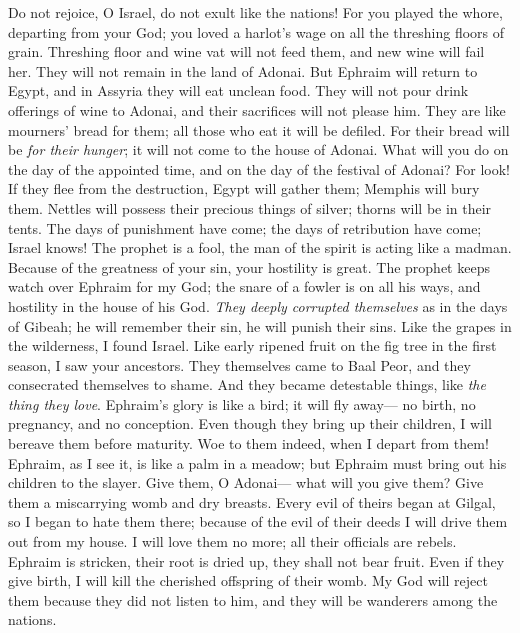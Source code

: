 \begin{biblechapter} %
 Do not rejoice, O Israel, 
do not exult like the nations! 
For you played the whore, departing from your God; 
you loved a harlot’s wage 
on all the threshing floors of grain.
\verse Threshing floor and wine vat will not feed them, 
and new wine will fail her.
\verse They will not remain 
in the land of Adonai. 
But Ephraim will return to Egypt, 
and in Assyria they will eat unclean food.
\verse They will not pour drink offerings of wine to Adonai, 
and their sacrifices will not please him. 
They are like mourners’ bread for them; 
all those who eat it will be defiled. 
For their bread will be \textit{for their hunger}; 
it will not come to the house of Adonai.
\verse What will you do on the day of the appointed time, 
and on the day of the festival of Adonai?
\verse For look! If they flee from the destruction, 
Egypt will gather them; 
Memphis will bury them. 
Nettles will possess 
their precious things of silver; 
thorns will be in their tents.
\verse The days of punishment have come; 
the days of retribution have come; 
Israel knows! 
The prophet is a fool, 
the man of the spirit is acting like a madman. 
Because of the greatness of your sin, 
your hostility is great.
\verse The prophet keeps watch over Ephraim for my God; 
the snare of a fowler is on all his ways, 
and hostility in the house of his God.
\verse \textit{They deeply corrupted themselves} 
as in the days of Gibeah; 
he will remember their sin, 
he will punish their sins.
\verse Like the grapes in the wilderness, 
I found Israel. 
Like early ripened fruit on the fig tree in the first season, 
I saw your ancestors. 
They themselves came to Baal Peor, 
and they consecrated themselves to shame. 
And they became detestable things, 
like \textit{the thing they love}.
\verse Ephraim’s glory is like a bird; 
it will fly away— 
no birth, no pregnancy, and no conception.
\verse Even though they bring up their children, 
I will bereave them before maturity. 
Woe to them indeed, 
when I depart from them!
\verse Ephraim, as I see it, 
is like a palm in a meadow; 
but Ephraim must bring out 
his children to the slayer.
\verse Give them, O Adonai— 
what will you give them? 
Give them a miscarrying womb 
and dry breasts.
\verse Every evil of theirs began at Gilgal, 
so I began to hate them there; 
because of the evil of their deeds 
I will drive them out from my house. 
I will love them no more; 
all their officials are rebels.
\verse Ephraim is stricken, 
their root is dried up, 
they shall not bear fruit. 
Even if they give birth, 
I will kill the cherished offspring of their womb.
\verse My God will reject them 
because they did not listen to him, 
and they will be wanderers among the nations.
\end{biblechapter}


